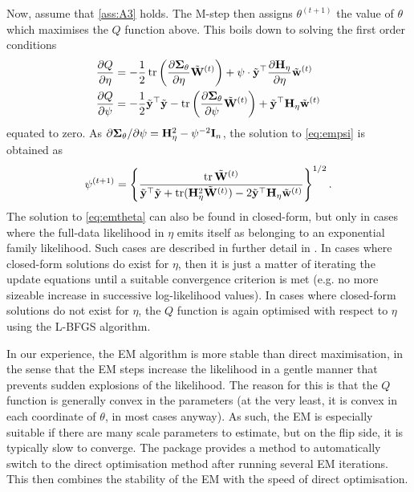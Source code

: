 Now, assume that \ref{ass:A3} holds.
The M-step then assigns $\theta^{(t+1)}$ the value of $\theta$ which maximises the $Q$ function above.
This boils down to solving the first order conditions
%
\begin{align}
  \frac{\partial Q}{\partial\eta}
  &= -\frac{1}{2} \operatorname{tr} \left(\frac{\partial {\bm\Sigma}_\theta}{\partial\eta} \tilde{{\mathbf W}}^{(t)} \right) + \psi \cdot \tilde{{\mathbf y}} ^\top \frac{\partial {\mathbf H}_\eta}{\partial\eta} \tilde{{\mathbf w}}^{(t)} \label{eq:emtheta} \\
  \frac{\partial Q}{\partial\psi}
  &= -\frac{1}{2} \tilde{{\mathbf y}}^\top\tilde{{\mathbf y}} - \operatorname{tr} \left(\frac{\partial {\bm\Sigma}_\theta}{\partial\psi} \tilde{{\mathbf W}}^{(t)} \right) + \tilde{{\mathbf y}}^\top {\mathbf H}_\eta \tilde{{\mathbf w}}^{(t)} \label{eq:empsi}
\end{align}
%
equated to zero.
As $\partial{\bm\Sigma}_\theta/\partial\psi = {\mathbf H}_\eta^2 - \psi^{-2}{\mathbf I}_n$, the solution to \eqref{eq:empsi} is obtained as
\begin{align}\label{eq:closedformpsi}
  \psi^{(t+1)} = 
  \left\{ \frac{\operatorname{tr} \tilde{\mathbf W}^{(t)}}{\tilde{{\mathbf y}}^\top\tilde{{\mathbf y}} + \operatorname{tr}({\mathbf H}_\eta^2\tilde{\mathbf W}^{(t)}) - 2\tilde{{\mathbf y}}^\top{\mathbf H}_\eta\tilde{\mathbf w}^{(t)}} \right\}^{1/2}.
\end{align}
The solution to \eqref{eq:emtheta} can also be found in closed-form, but only in cases where the full-data likelihood in $\eta$ emits itself as belonging to an exponential family likelihood.
Such cases are described in further detail in .
In cases where closed-form solutions do exist for $\eta$, then it is just a matter of iterating the update equations until a suitable convergence criterion is met (e.g. no more sizeable increase in successive log-likelihood values).
In cases where closed-form solutions do not exist for $\eta$, the $Q$ function is again optimised with respect to $\eta$ using the L-BFGS algorithm.

In our experience, the EM algorithm is more stable than direct maximisation, in the sense that the EM steps increase the likelihood in a gentle manner that prevents sudden explosions of the likelihood.
The reason for this is that the $Q$ function is generally convex in the parameters (at the very least, it is convex in each coordinate of $\theta$, in most cases anyway).
As such, the EM is especially suitable if there are many scale parameters to estimate, but on the flip side, it is typically slow to converge.
The  package provides a method to automatically switch to the direct optimisation method after running several EM iterations.
This then combines the stability of the EM with the speed of direct optimisation.

